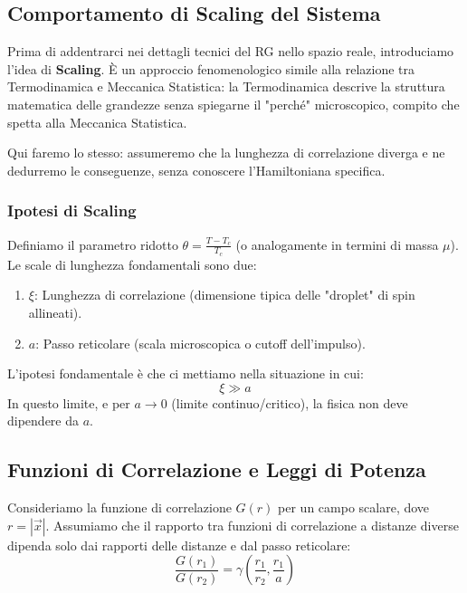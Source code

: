 \subsection{Comportamento di Scaling del Sistema}

Prima di addentrarci nei dettagli tecnici del RG nello spazio reale, introduciamo l'idea di \textbf{Scaling}. È un approccio fenomenologico simile alla relazione tra Termodinamica e Meccanica Statistica: la Termodinamica descrive la struttura matematica delle grandezze senza spiegarne il "perché" microscopico, compito che spetta alla Meccanica Statistica.

Qui faremo lo stesso: assumeremo che la lunghezza di correlazione diverga e ne dedurremo le conseguenze, senza conoscere l'Hamiltoniana specifica.

\subsubsection{Ipotesi di Scaling}

Definiamo il parametro ridotto $\theta = \frac{T - T_c}{T_c}$ (o analogamente in termini di massa $\mu$).
Le scale di lunghezza fondamentali sono due:
\begin{enumerate}
    \item $\xi$: Lunghezza di correlazione (dimensione tipica delle "droplet" di spin allineati).
    \item $a$: Passo reticolare (scala microscopica o cutoff dell'impulso).
\end{enumerate}

L'ipotesi fondamentale è che ci mettiamo nella situazione in cui:
\begin{equation}
\xi \gg a
\end{equation}
In questo limite, e per $a \to 0$ (limite continuo/critico), la fisica non deve dipendere da $a$.

\subsection{Funzioni di Correlazione e Leggi di Potenza}

Consideriamo la funzione di correlazione $G(r)$ per un campo scalare, dove $r = |\vec{x}|$.
Assumiamo che il rapporto tra funzioni di correlazione a distanze diverse dipenda solo dai rapporti delle distanze e dal passo reticolare:
\begin{equation}
\frac{G(r_1)}{G(r_2)} = \gamma\left(\frac{r_1}{r_2}, \frac{r_1}{a}\right)
\end{equation}

